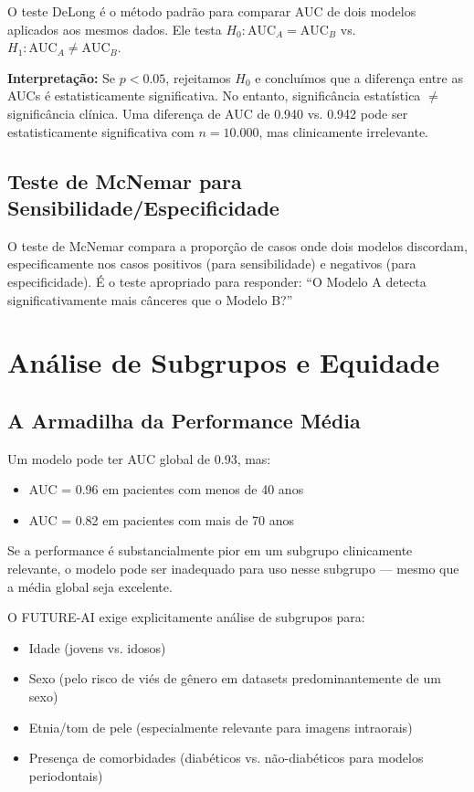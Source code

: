 O teste DeLong  é o método padrão para comparar AUC de dois modelos aplicados aos mesmos dados. Ele testa $H_0: \text{AUC}_A = \text{AUC}_B$ vs. $H_1: \text{AUC}_A \neq \text{AUC}_B$.

\textbf{Interpretação:} Se $p < 0.05$, rejeitamos $H_0$ e concluímos que a diferença entre as AUCs é estatisticamente significativa. No entanto, significância estatística $\neq$ significância clínica. Uma diferença de AUC de 0.940 vs. 0.942 pode ser estatisticamente significativa com $n=10.000$, mas clinicamente irrelevante.

\subsection{Teste de McNemar para Sensibilidade/Especificidade}

O teste de McNemar  compara a proporção de casos onde dois modelos discordam, especificamente nos casos positivos (para sensibilidade) e negativos (para especificidade). É o teste apropriado para responder: ``O Modelo A detecta significativamente mais cânceres que o Modelo B?''

\section{Análise de Subgrupos e Equidade}

\subsection{A Armadilha da Performance Média}

Um modelo pode ter AUC global de 0.93, mas:
\begin{itemize}
    \item AUC = 0.96 em pacientes com menos de 40 anos
    \item AUC = 0.82 em pacientes com mais de 70 anos
\end{itemize}

Se a performance é substancialmente pior em um subgrupo clinicamente relevante, o modelo pode ser inadequado para uso nesse subgrupo — mesmo que a média global seja excelente.

O FUTURE-AI  exige explicitamente análise de subgrupos para:
\begin{itemize}
    \item Idade (jovens vs. idosos)
    \item Sexo (pelo risco de viés de gênero em datasets predominantemente de um sexo)
    \item Etnia/tom de pele (especialmente relevante para imagens intraorais)
    \item Presença de comorbidades (diabéticos vs. não-diabéticos para modelos periodontais)
\end{itemize}

